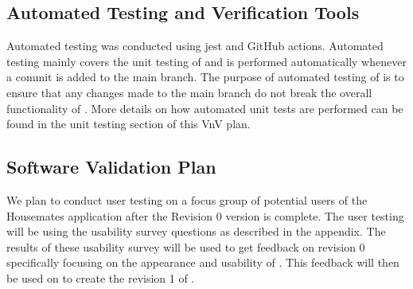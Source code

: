 \documentclass[12pt, titlepage]{article}
\begin{document}


\subsection{Automated Testing and Verification Tools}

Automated testing was conducted using jest and GitHub actions. Automated testing mainly covers the unit testing of \progname{} and is performed automatically whenever a commit is added to the main branch. The purpose of automated testing of \progname{} is to ensure that any changes made to the main branch do not break the overall functionality of \progname{}. More details on how automated unit tests are performed can be found in the unit testing section of this VnV plan.





\subsection{Software Validation Plan}

We plan to conduct user testing on a focus group of potential users of the Housemates application after the Revision 0 version is complete. The user testing will be using the usability survey questions as described in the appendix. The results of these usability survey will be used to get feedback on revision 0 specifically focusing on the appearance and usability of \progname{}. This feedback will then be used on to create the revision 1 of \progname{}.
\end{document}
